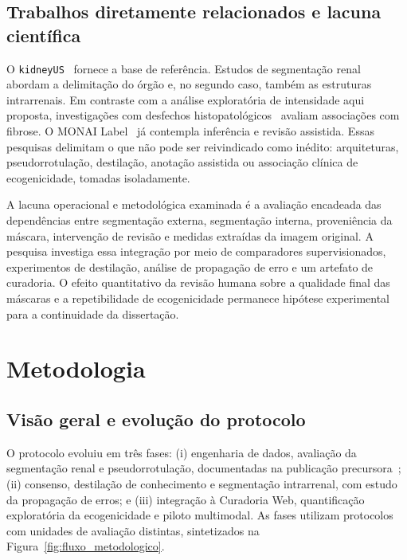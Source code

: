 \documentclass[12pt]{article}
\begin{document}
\subsection{Trabalhos diretamente relacionados e lacuna científica}
O \texttt{kidneyUS}~\cite{Singla2023KidneyUS} fornece a base de referência. Estudos de segmentação renal~\cite{Khan2024KidneySeg,Zuo2025RenalAttention} abordam a delimitação do órgão e, no segundo caso, também as estruturas intrarrenais. Em contraste com a análise exploratória de intensidade aqui proposta, investigações com desfechos histopatológicos~\cite{Athavale2021} avaliam associações com fibrose. O MONAI Label~\cite{DiazPinto2024MONAILabel} já contempla inferência e revisão assistida. Essas pesquisas delimitam o que não pode ser reivindicado como inédito: arquiteturas, pseudorrotulação, destilação, anotação assistida ou associação clínica de ecogenicidade, tomadas isoladamente.

A lacuna operacional e metodológica examinada é a avaliação encadeada das dependências entre segmentação externa, segmentação interna, proveniência da máscara, intervenção de revisão e medidas extraídas da imagem original. A pesquisa investiga essa integração por meio de comparadores supervisionados, experimentos de destilação, análise de propagação de erro e um artefato de curadoria. O efeito quantitativo da revisão humana sobre a qualidade final das máscaras e a repetibilidade de ecogenicidade permanece hipótese experimental para a continuidade da dissertação.

\section{Metodologia}

\subsection{Visão geral e evolução do protocolo}
O protocolo evoluiu em três fases: (i) engenharia de dados, avaliação da segmentação renal e pseudorrotulação, documentadas na publicação precursora~\cite{Anjos2026SBBD}; (ii) consenso, destilação de conhecimento e segmentação intrarrenal, com estudo da propagação de erros; e (iii) integração à Curadoria Web, quantificação exploratória da ecogenicidade e piloto multimodal. As fases utilizam protocolos com unidades de avaliação distintas, sintetizados na Figura~\ref{fig:fluxo_metodologico}.
\end{document}
